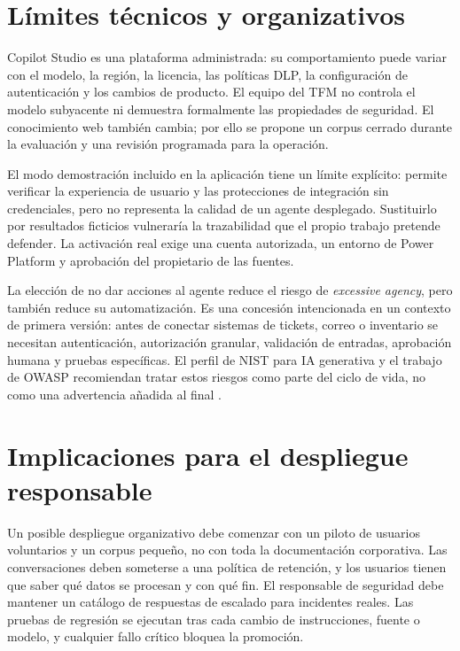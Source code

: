 \section{L\'imites t\'ecnicos y organizativos}

Copilot Studio es una plataforma administrada: su comportamiento puede variar con el modelo, la regi\'on, la licencia, las pol\'iticas DLP, la configuraci\'on de autenticaci\'on y los cambios de producto. El equipo del TFM no controla el modelo subyacente ni demuestra formalmente las propiedades de seguridad. El conocimiento web tambi\'en cambia; por ello se propone un corpus cerrado durante la evaluaci\'on y una revisi\'on programada para la operaci\'on.

El modo demostraci\'on incluido en la aplicaci\'on tiene un l\'imite expl\'icito: permite verificar la experiencia de usuario y las protecciones de integraci\'on sin credenciales, pero no representa la calidad de un agente desplegado. Sustituirlo por resultados ficticios vulnerar\'ia la trazabilidad que el propio trabajo pretende defender. La activaci\'on real exige una cuenta autorizada, un entorno de Power Platform y aprobaci\'on del propietario de las fuentes.

La elecci\'on de no dar acciones al agente reduce el riesgo de \emph{excessive agency}, pero tambi\'en reduce su automatizaci\'on. Es una concesi\'on intencionada en un contexto de primera versi\'on: antes de conectar sistemas de tickets, correo o inventario se necesitan autenticaci\'on, autorizaci\'on granular, validaci\'on de entradas, aprobaci\'on humana y pruebas espec\'ificas. El perfil de NIST para IA generativa y el trabajo de OWASP recomiendan tratar estos riesgos como parte del ciclo de vida, no como una advertencia a\~nadida al final \cite{nistGenAi2024,owaspLlm2026}.

\section{Implicaciones para el despliegue responsable}

Un posible despliegue organizativo debe comenzar con un piloto de usuarios voluntarios y un corpus peque\~no, no con toda la documentaci\'on corporativa. Las conversaciones deben someterse a una pol\'itica de retenci\'on, y los usuarios tienen que saber qu\'e datos se procesan y con qu\'e fin. El responsable de seguridad debe mantener un cat\'alogo de respuestas de escalado para incidentes reales. Las pruebas de regresi\'on se ejecutan tras cada cambio de instrucciones, fuente o modelo, y cualquier fallo cr\'itico bloquea la promoci\'on.

